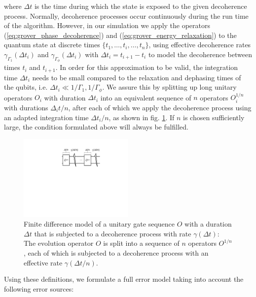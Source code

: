 where $\Delta t$ is the time during which the state is exposed to the given decoherence process. Normally, decoherence processes occur continuously during the run time of the algorithm. However, in our simulation we apply the operators (\ref{eq:grover_phase_decoherence}) and (\ref{eq:grover_energy_relaxation}) to the quantum state at discrete times $\{t_1,\hdots,t_i,\hdots,t_n\}$, using effective decoherence rates $\gamma_{\Gamma_1}(\Delta t_i)$ and $\gamma_{\Gamma_\phi}(\Delta t_i)$ with $\Delta t_i = t_{i+1}-t_i$ to model the decoherence between times $t_{i}$ and $t_{i+1}$. In order for this approximation to be valid, the integration time $\Delta t_i$ needs to be small compared to the relaxation and dephasing times of the qubits, i.e. $\Delta t_i \ll 1/\Gamma_1,1/\Gamma_\phi$. We assure this by splitting up long unitary operators $O_i$ with duration $\Delta t_i$ into an equivalent sequence of $n$ operators $O_i^{1/n}$ with durations $\Delta_i t/n$, after each of which we apply the decoherence process using an adapted integration time $\Delta t_i/n$, as shown in fig. \ref{fig:error_model_trotterization}. If $n$ is chosen sufficiently large, the condition formulated above will always be fulfilled.

\begin{figure}
	\centering
	\includegraphics[width=0.5\textwidth]{"./material/papers/grover/error_model_trotterization"}
	\caption{Finite difference model of a unitary gate sequence $O$ with a duration $\Delta t$ that is subjected to a decoherence process with rate $\gamma(\Delta t)$: The evolution operator $O$ is split into a sequence of $n$ operators $O^{1/n}$, each of which is subjected to a decoherence process with an effective rate $\gamma(\Delta t/n)$.}
	\label{fig:error_model_trotterization}
\end{figure}

\smallskip

Using these definitions, we formulate a full error model taking into account the following error sources:

